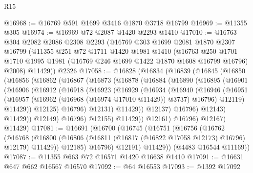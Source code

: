 \begin{lexlean}{R15}
\begin{coremodule}
@16968 := @16769 @591 @1699 @3416 @1870 @3718 @16799
@16969 := @11355 @305
@16974 := @16969 @72 @2087 @1420 @2293 @1410
@17010 := @16763
    @304
    @2082
    @2086
    @2308
    @2293
    (@16769
      @303
      @1699
      @2081
      @1870
      @2307
      @16799
      (@11355
        @251
        @72
        @1711
        @1420
        @1981
        @1410
        (@16763
          @250
          @1701
          @1710
          @1995
          @1981
          (@16769 @246 @1699 @1422 @1870 @1608 @16799 @16796)
          @2008)
        @11429))
    @2326
@17058 := @16828
    (@16834
      (@16839
        (@16845
          (@16850
            (@16856
              (@16862
                (@16867
                  (@16873
                    (@16878
                      (@16884
                        (@16890
                          (@16895
                            (@16901
                              (@16906
                                (@16912
                                  (@16918
                                    (@16923
                                      (@16929
                                        (@16934
                                          (@16940
                                            (@16946
                                              (@16951
                                                (@16957
                                                  (@16962 (@16968 (@16974 @17010 @11429)) @3737)
                                                  @16796)
                                                @12119)
                                              @11429))
                                          @12125)
                                        @16796)
                                      @12131)
                                    @11429))
                                @12137)
                              @16796)
                            @12143)
                          @11429))
                      @12149)
                    @16796)
                  @12155)
                @11429))
            @12161)
          @16796)
        @12167)
      @11429)
@17081 := @16691
    (@16700
      (@16745
        (@16751
          (@16756
            (@16762
              (@16768
                (@16800 (@16806 (@16811 (@16817 (@16822 @17058 @12173) @16796) @12179) @11429))
                @12185)
              @16796)
            @12191)
          @11429))
      (@4483 @16544 @11169))
@17087 := @11355 @663 @72 @16571 @1420 @16638 @1410
@17091 := @16631 @647 @662 @16567 @16570
@17092 := @64 @16553
@17093 := @1392 @17092

\end{coremodule}
\end{lexlean}
